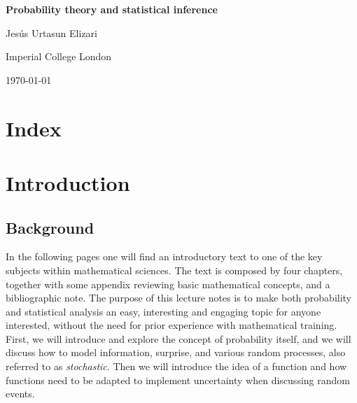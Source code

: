 \documentclass{book}
\begin{document}
\frontmatter

\begin{titlepage}
    \centering
    \vspace*{\fill}
    {\Huge\bfseries Probability theory and statistical inference\par}
    \vspace{1cm}
    {\Large Jes\'us Urtasun Elizari\par}
    \vspace{1cm}
     {\Large Imperial College London\par}
    \vspace{1cm}
    {\large\today\par}
    \vspace*{\fill}
\end{titlepage}

\tableofcontents

\chapter*{Index}
\printindex

\mainmatter

\chapter*{Introduction}

\section{Background}
\indent In the following pages one will find an introductory text to one of the key subjects within mathematical sciences. The text is composed by four chapters, together with some appendix reviewing basic mathematical concepts, and a bibliographic note. The purpose of this lecture notes is to make both probability and statistical analysis an easy, interesting and engaging topic for anyone interested, without the need for prior experience with mathematical training.\\

First, we will introduce and explore the concept of probability itself, and we will discuss how to model information, surprise, and various random processes, also referred to as \textit{stochastic}. Then we will introduce the idea of a function and how functions need to be adapted to implement uncertainty when discussing random events.\\
\end{document}
